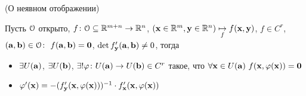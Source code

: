 \begin{theorem}(О неявном отображении)

    Пусть $\mathcal{O}$ открыто, $f \colon \mathcal{O} \subseteq \mathbb{R}^{m + n} \to \mathbb{R}^n$, $(\mathbf{x} \in
    \mathbb{R}^m, \mathbf{y} \in \mathbb{R}^n) \underset{f}{\mapsto} f(\mathbf{x}, \mathbf{y})$, $f \in
    C^r$, \\ $(\mathbf{a}, \mathbf{b}) \in \mathcal{O} \colon~ f(\mathbf{a}, \mathbf{b}) = \mathbf{0}$,
    $\det{f'_{\mathbf{y}}(\mathbf{a}, \mathbf{b})} \neq 0$, тогда
    \begin{itemize}
        \item $\exists U(\mathbf{a})$, $\exists U(\mathbf{b})$, $\exists! \varphi \colon U(\mathbf{a})
        \to U(\mathbf{b}) \in C^r$ такое, что $\forall \mathbf{x} \in U(\mathbf{a})~ f(\mathbf{x}, \varphi(\mathbf{x})) =
        \mathbf{0}$ \item $\varphi'(\mathbf{x}) = -(f'_{\mathbf{y}}(\mathbf{x}, \varphi(\mathbf{x})))^{-1} \cdot
        f'_{\mathbf{x}}(\mathbf{x}, \varphi(\mathbf{x}))$
    \end{itemize}
\end{theorem}
